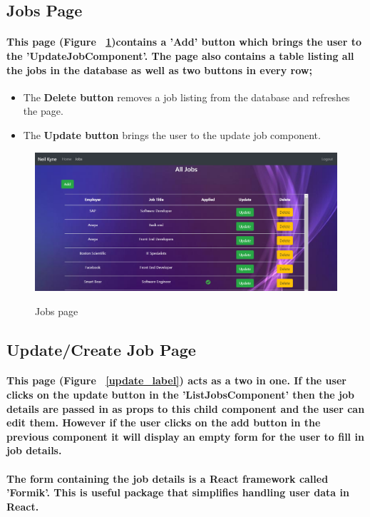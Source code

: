 \subsection{Jobs Page}
\paragraph{This page (Figure ~\ref{jobs_label})contains a 'Add' button which brings the user to the 'UpdateJobComponent'. The page also contains a table listing all the jobs in the database as well as two buttons in every row;}
\begin{itemize}
    \item The \textbf{Delete button} removes a job listing from the database and refreshes the page.
    \item The \textbf{Update button} brings the user to the update job component.
\end{itemize}
\begin{figure}[ht]
    \centering
    \includegraphics[scale=0.3]{Images/jobs.png} 
    \label{jobs_label}
    \caption{Jobs page}
\end{figure}
\subsection{Update/Create Job Page}
\paragraph{This page (Figure ~\ref{update_label}) acts as a two in one. If the user clicks on the update button in the 'ListJobsComponent' then the job details are passed in as props to this child component and the user can edit them. However if the user clicks on the add button in the previous component it will display an empty form for the user to fill in job details.}
\paragraph{The form containing the job details is a React framework called 'Formik'. This is useful package that simplifies handling user data in React.}
